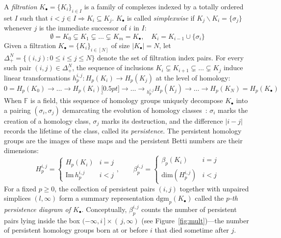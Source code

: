 A \emph{filtration} $K_\bullet = \{K_i\}_{i\in I}$ is a family of complexes indexed by a totally ordered set $I$  such that $i< j \in I \Rightarrow K_i \subseteq K_j$. $K_\bullet$ is called \emph{simplexwise} if $K_j \smallsetminus K_i = \{\sigma_j\}$ whenever $j$ is the immediate successor of $i$ in $I$:
\begin{equation}
	\emptyset = K_0 \subsetneq K_1 \subsetneq \dots \subsetneq K_m  = K_\bullet, \quad K_i  = K_{i-1} \cup \{\sigma_i\}
\end{equation} 
Given a filtration $K_\bullet = \{K_i\}_{i\in [N]}$ of size $\lvert K_\bullet \rvert = N$,  
let $\Delta_{+}^N = \{ (i,j) : 0 \leq i \leq j \leq N \}$ denote the set of filtration index pairs. 
For every such pair $(i,j) \in \Delta_{+}^N$, the sequence of inclusions $K_i \subsetneq K_{i+1} \subsetneq \dots \subsetneq K_j$ induce linear transformations $h_p^{i,j} :  H_p(K_i) \to H_p(K_j)$ at the level of homology:
\begin{equation}\label{eq:hom_map}
	0 = H_p(K_0) \to \dots \to H_p(K_i) \underbracket[0.5pt]{\to \dots \to}_{h_p^{i,j}} H_p(K_j) \to \dots \to H_p(K_N) = H_p(K_\bullet) 
\end{equation}
When $\mathbb{F}$ is a field, this sequence of homology groups uniquely decompose $K_\bullet$ into a pairing $(\sigma_i, \sigma_j)$ demarcating the evolution of homology classes~\cite{zomorodian2004computing}: $\sigma_i$ marks the creation of a homology class, $\sigma_j$ marks its destruction, and the difference $\lvert i - j \rvert$ records the lifetime of the class, called its \emph{persistence}.
The persistent homology groups are the images of these maps and the persistent Betti numbers are their dimensions:
\begin{equation}
	H_{p}^{i,j} = \begin{cases}
	H_p(K_i) & i = j \\ 
 	\mathrm{Im}\,h_p^{i,j} & i < j
 \end{cases}
, \quad \quad 
\beta_p^{i,j} = \begin{cases}
 	\beta_p(K_i) & i = j \\
 	\mathrm{dim}(H_{p}^{i,j}) & i < j
 \end{cases}
\end{equation}
For a fixed $p \geq 0$, the collection of persistent pairs $(i, j)$ together with unpaired simplices $(l, \infty)$ form a summary representation $\mathrm{dgm}_p(K_\bullet)$ called the \emph{$p$-th persistence diagram of $K_\bullet$}. Conceptually, $\beta_p^{i,j}$ counts the number of persistent pairs lying inside the box $(-\infty, i\,] \times (\,j, \infty)$ (see Figure~\ref{fig:mult})---the number of persistent homology groups born at or before $i$ that died sometime after $j$. 

